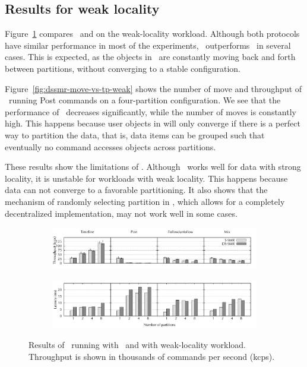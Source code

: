 \subsection{Results for weak locality} \label{sec:dssmr-evaluation:weakloc}

Figure~\ref{fig:dssmr-weakloc} compares 
 \dssmr\ and \ssmr on the weak-locality workload. Although both protocols
have similar performance in most of the experiments, \ssmr\ outperforms
\dssmr\ in several cases. This is expected, as the objects in \dssmr\ are constantly
moving back and forth between partitions, without converging to a stable
configuration.

Figure~\ref{fig:dssmr-move-vs-tp-weak}
shows the number of move and throughput of \dssmr\ running Post commands on a
four-partition configuration. We see that the performance of \dssmr\ decreases
significantly, while the number of moves is constantly high. This happens
because user objects in \dssmr{} will only converge if there is a perfect way to
partition the data, that is, data items can be grouped such that eventually no
command accesses objects across partitions. 

These results show the limitations of \dssmr. Although \dssmr\ works well for
data with strong locality, it is unstable for workloads with weak locality.
This happens because data can not converge to a favorable partitioning. 
It also shows that the mechanism of randomly
selecting partition in \dssmr, which allows for a completely decentralized
implementation, may not work well in some cases.

\begin{figure}[ht!]
\centering
\begin{subfigure}{1\columnwidth}
      \centering
      \includegraphics[width=\textwidth]{./figures/experiments/dssmr/dssmr-weak-locality-tp}
\end{subfigure}
\begin{subfigure}{1\columnwidth}
      \centering
      \includegraphics[width=\textwidth]{./figures/experiments/dssmr/dssmr-weak-locality-lat}
\end{subfigure}
\caption{Results of \dssmrappname\ running with \ssmr\ and \dssmr{} with weak-locality workload. Throughput is shown in thousands of commands per second (kcps).}
\label{fig:dssmr-weakloc}
\end{figure}
      
